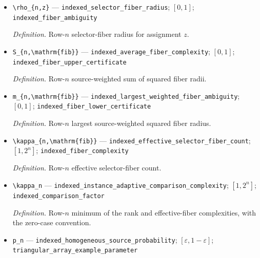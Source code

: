\documentclass{article}
\begin{document}
\begin{itemize}
  \par\smallskip\noindent\emph{Definition.} Row-\(n\) version of \(r_{\star}\).
  \item \texttt{\textbackslash{}\allowbreak{}rho\_\allowbreak{}\{n,\allowbreak{}z\}\allowbreak{}} --- \texttt{indexed\_\allowbreak{}selector\_\allowbreak{}fiber\_\allowbreak{}radius}; \([0,1]\); \texttt{indexed\_\allowbreak{}fiber\_\allowbreak{}ambiguity}
  \par\smallskip\noindent\emph{Definition.} Row-\(n\) selector-fiber radius for assignment \(z\).
  \item \texttt{S\_\allowbreak{}\{n,\allowbreak{}\textbackslash{}\allowbreak{}mathrm\{fib\}\allowbreak{}\}\allowbreak{}} --- \texttt{indexed\_\allowbreak{}average\_\allowbreak{}fiber\_\allowbreak{}complexity}; \([0,1]\); \texttt{indexed\_\allowbreak{}fiber\_\allowbreak{}upper\_\allowbreak{}certificate}
  \par\smallskip\noindent\emph{Definition.} Row-\(n\) source-weighted sum of squared fiber radii.
  \item \texttt{m\_\allowbreak{}\{n,\allowbreak{}\textbackslash{}\allowbreak{}mathrm\{fib\}\allowbreak{}\}\allowbreak{}} --- \texttt{indexed\_\allowbreak{}largest\_\allowbreak{}weighted\_\allowbreak{}fiber\_\allowbreak{}ambiguity}; \([0,1]\); \texttt{indexed\_\allowbreak{}fiber\_\allowbreak{}lower\_\allowbreak{}certificate}
  \par\smallskip\noindent\emph{Definition.} Row-\(n\) largest source-weighted squared fiber radius.
  \item \texttt{\textbackslash{}\allowbreak{}kappa\_\allowbreak{}\{n,\allowbreak{}\textbackslash{}\allowbreak{}mathrm\{fib\}\allowbreak{}\}\allowbreak{}} --- \texttt{indexed\_\allowbreak{}effective\_\allowbreak{}selector\_\allowbreak{}fiber\_\allowbreak{}count}; \([1,2^n]\); \texttt{indexed\_\allowbreak{}fiber\_\allowbreak{}complexity}
  \par\smallskip\noindent\emph{Definition.} Row-\(n\) effective selector-fiber count.
  \item \texttt{\textbackslash{}\allowbreak{}kappa\_\allowbreak{}n} --- \texttt{indexed\_\allowbreak{}instance\_\allowbreak{}adaptive\_\allowbreak{}comparison\_\allowbreak{}complexity}; \([1,2^n]\); \texttt{indexed\_\allowbreak{}comparison\_\allowbreak{}factor}
  \par\smallskip\noindent\emph{Definition.} Row-\(n\) minimum of the rank and effective-fiber complexities, with the zero-case convention.
  \item \texttt{p\_\allowbreak{}n} --- \texttt{indexed\_\allowbreak{}homogeneous\_\allowbreak{}source\_\allowbreak{}probability}; \([\varepsilon,1-\varepsilon]\); \texttt{triangular\_\allowbreak{}array\_\allowbreak{}example\_\allowbreak{}parameter}

\end{itemize}
\end{document}
